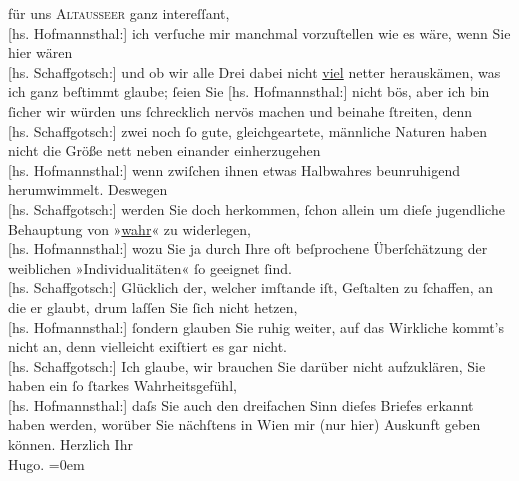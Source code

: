 \begin{ledgroupsized}[t]{13cm}
               für uns \textsc{Altausseer} ganz intereſſant, {\\}{[}hs. Hofmannsthal:{]} ich verſuche mir manchmal vor\introOben{}zu\introOben{}ſtellen wie es wäre, wenn Sie hier wären {\\}{[}hs. Schaffgotsch:{]} und ob wir alle Drei dabei nicht \uline{viel} netter herauskämen, was ich ganz beſtimmt glaube; ſeien
               Sie \pend
           \pstart
           {\pb}{[}hs. Hofmannsthal:{]} nicht bös, aber ich bin ſicher wir würden uns { }ſchrecklich nervös machen und beinahe ſtreiten, denn {\\}{[}hs. Schaffgotsch:{]} zwei noch ſo gute, gleichgeartete, männliche Naturen
               haben nicht die Größe nett neben einander einherzugehen {\\}{[}hs. Hofmannsthal:{]} wenn zwiſchen ihnen etwas Halbwahres beunruhigend
               herumwimmelt. Deswegen {\\}{[}hs. Schaffgotsch:{]} werden Sie doch herkommen, ſchon allein um dieſe jugendliche Behauptung von »\uline{wahr}« zu widerlegen, {\\}{[}hs. Hofmannsthal:{]} wozu Sie ja durch Ihre oft beſprochene Überſchätzung
               der weiblichen »Individualitäten« ſo geeignet ſind. {\\}{[}hs. Schaffgotsch:{]} Glücklich der, welcher imſtande iſt, Geſtalten zu
               ſchaffen, an die er glaubt, drum laſſen Sie ſich nicht hetzen, {\\}{[}hs. Hofmannsthal:{]} ſondern glauben Sie ruhig weiter, auf das Wirkliche
               kommt’s nicht an, denn vielleicht exiſtiert es gar nicht. {\\}{[}hs. Schaffgotsch:{]} Ich glaube, wir brauchen Sie darüber nicht
               aufzuklären, Sie haben ein ſo ſtarkes Wahrheitsgefühl, {\\}{[}hs. Hofmannsthal:{]} daſs Sie auch den dreifachen Sinn dieſes Briefes
               erkannt haben werden, worüber Sie nächſtens in Wien mir (nur hier) Auskunft geben können.\pend
           \pstart
           Herzlich Ihr{\\[\baselineskip]}\spacefill\mbox{Hugo.}\pend
           \leftskip=0em{}
         
         \endnumbering{}\end{ledgroupsized}  \newcommand{\dateiname}{L00580}\newcommand{\titel}{Hugo von Hofmannsthal und Hermine Benedict an Arthur Schnitzler, 21. [8. 1896]}\newcommand{\editorInnen}{Martin Anton Müller und Gerd-Hermann Susen}
      
